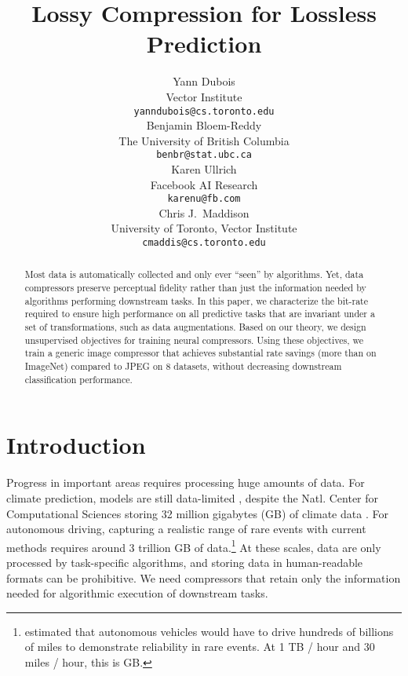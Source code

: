 \documentclass[final]{article}
\title{Lossy Compression for Lossless Prediction }
\author{Yann Dubois\\
  Vector Institute \\
  \texttt{yanndubois@cs.toronto.edu} \\
  \And  
  Benjamin Bloem-Reddy\\
  The University of British Columbia \\
  \texttt{benbr@stat.ubc.ca} \\
  \AND
  Karen Ullrich \\
  Facebook AI Research \\
  \texttt{karenu@fb.com} \\
  \And
  Chris J.~Maddison \\
  University of Toronto, Vector Institute \\
  \texttt{cmaddis@cs.toronto.edu} \\
}
\begin{document}
\doparttoc \faketableofcontents 

\maketitle

\begin{abstract}
Most data is automatically collected and only ever ``seen'' by algorithms.
Yet, data compressors preserve perceptual fidelity rather than just the information needed by algorithms performing downstream tasks.
In this paper, we characterize the bit-rate required to ensure high performance on all predictive tasks that are invariant under a set of transformations, such as data augmentations.
Based on our theory, we design unsupervised objectives for training neural compressors.
Using these objectives, we train a generic image compressor that achieves substantial rate savings (more than  on ImageNet) compared to JPEG on 8 datasets, without decreasing downstream classification performance.
\end{abstract}

 
\section{Introduction}
\label{sec:introduction}







Progress in important areas requires processing huge amounts of data. 
For climate prediction, models are still data-limited \cite{rolnick_tackling_2019}, despite the Natl. Center for Computational Sciences storing 32 million gigabytes (GB) of climate data \cite{zgurovsky_big_2020}. For autonomous driving, capturing a realistic range of rare events with current methods requires around 3 trillion GB of data.\footnote{\citet{kalra_driving_2016} estimated that autonomous vehicles would have to drive hundreds of billions of miles to demonstrate reliability in rare events. At 1 TB / hour \citep{yeong_sensor_2021} and 30 miles / hour, this is  GB.}
At these scales, data are only processed by task-specific algorithms, and storing data in human-readable formats can be prohibitive.
We need compressors that retain only the information needed for algorithmic execution of downstream tasks.
\end{document}
